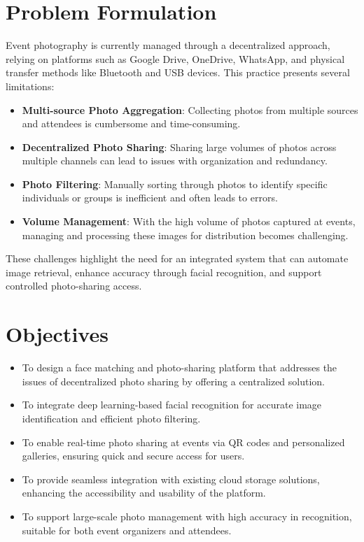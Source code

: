 \documentclass[12pt,a4paper]{report}
\begin{document}
\section{Problem Formulation}

Event photography is currently managed through a decentralized approach, relying on platforms such as Google Drive, OneDrive, WhatsApp, and physical transfer methods like Bluetooth and USB devices. This practice presents several limitations:

\begin{itemize} \item \textbf{Multi-source Photo Aggregation}: Collecting photos from multiple sources and attendees is cumbersome and time-consuming. \item \textbf{Decentralized Photo Sharing}: Sharing large volumes of photos across multiple channels can lead to issues with organization and redundancy. \item \textbf{Photo Filtering}: Manually sorting through photos to identify specific individuals or groups is inefficient and often leads to errors. \item \textbf{Volume Management}: With the high volume of photos captured at events, managing and processing these images for distribution becomes challenging. \end{itemize}

These challenges highlight the need for an integrated system that can automate image retrieval, enhance accuracy through facial recognition, and support controlled photo-sharing access.

\section{Objectives} \begin{itemize} \item To design a face matching and photo-sharing platform that addresses the issues of decentralized photo sharing by offering a centralized solution. \item To integrate deep learning-based facial recognition for accurate image identification and efficient photo filtering. \item To enable real-time photo sharing at events via QR codes and personalized galleries, ensuring quick and secure access for users. \item To provide seamless integration with existing cloud storage solutions, enhancing the accessibility and usability of the platform. \item To support large-scale photo management with high accuracy in recognition, suitable for both event organizers and attendees. \end{itemize}
\end{document}
